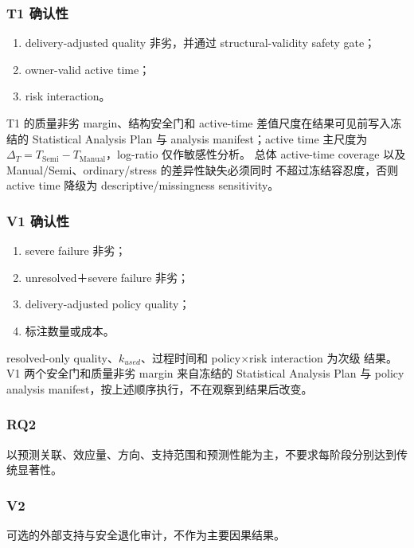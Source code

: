 \subsubsection{T1 确认性}

\begin{enumerate}
  \item delivery-adjusted quality 非劣，并通过 structural-validity safety gate；
  \item owner-valid active time；
  \item risk interaction。
\end{enumerate}

T1 的质量非劣 margin、结构安全门和 active-time 差值尺度在结果可见前写入冻结的
Statistical Analysis Plan 与 analysis manifest；active time 主尺度为
\(\Delta_T=T_{\mathrm{Semi}}-T_{\mathrm{Manual}}\)，log-ratio 仅作敏感性分析。
总体 active-time coverage 以及 Manual/Semi、ordinary/stress 的差异性缺失必须同时
不超过冻结容忍度，否则 active time 降级为 descriptive/missingness sensitivity。

\subsubsection{V1 确认性}

\begin{enumerate}
  \item severe failure 非劣；
  \item unresolved＋severe failure 非劣；
  \item delivery-adjusted policy quality；
  \item 标注数量或成本。
\end{enumerate}

resolved-only quality、\(k_{used}\)、过程时间和 policy\(\times\)risk interaction 为次级
结果。V1 两个安全门和质量非劣 margin 来自冻结的 Statistical Analysis Plan 与
policy analysis manifest，按上述顺序执行，不在观察到结果后改变。

\subsubsection{RQ2}

以预测关联、效应量、方向、支持范围和预测性能为主，不要求每阶段分别达到传统显著性。

\subsubsection{V2}

可选的外部支持与安全退化审计，不作为主要因果结果。

